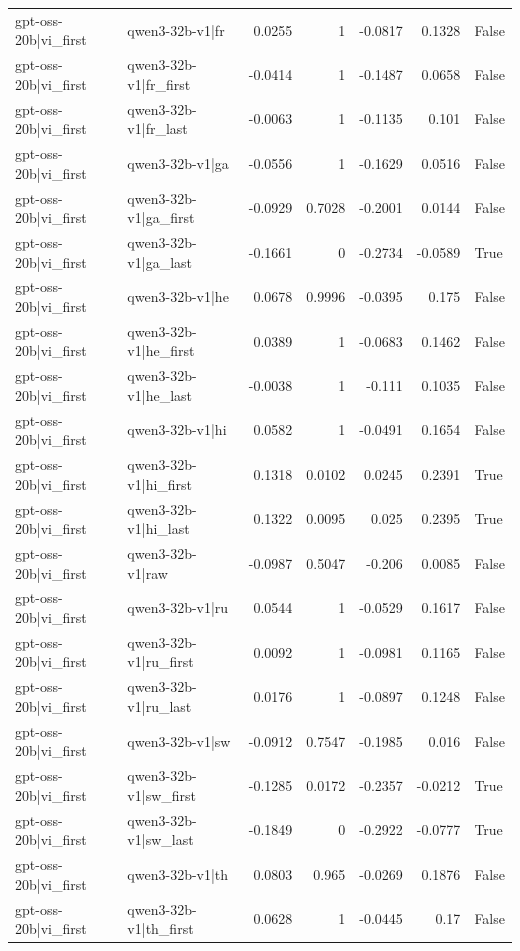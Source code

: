 \begin{table}
\begin{tabular}{l l r r r r l}
gpt-oss-20b|vi_first & qwen3-32b-v1|fr & 0.0255 & 1 & -0.0817 & 0.1328 & False \\
gpt-oss-20b|vi_first & qwen3-32b-v1|fr_first & -0.0414 & 1 & -0.1487 & 0.0658 & False \\
gpt-oss-20b|vi_first & qwen3-32b-v1|fr_last & -0.0063 & 1 & -0.1135 & 0.101 & False \\
gpt-oss-20b|vi_first & qwen3-32b-v1|ga & -0.0556 & 1 & -0.1629 & 0.0516 & False \\
gpt-oss-20b|vi_first & qwen3-32b-v1|ga_first & -0.0929 & 0.7028 & -0.2001 & 0.0144 & False \\
gpt-oss-20b|vi_first & qwen3-32b-v1|ga_last & -0.1661 & 0 & -0.2734 & -0.0589 & True \\
gpt-oss-20b|vi_first & qwen3-32b-v1|he & 0.0678 & 0.9996 & -0.0395 & 0.175 & False \\
gpt-oss-20b|vi_first & qwen3-32b-v1|he_first & 0.0389 & 1 & -0.0683 & 0.1462 & False \\
gpt-oss-20b|vi_first & qwen3-32b-v1|he_last & -0.0038 & 1 & -0.111 & 0.1035 & False \\
gpt-oss-20b|vi_first & qwen3-32b-v1|hi & 0.0582 & 1 & -0.0491 & 0.1654 & False \\
gpt-oss-20b|vi_first & qwen3-32b-v1|hi_first & 0.1318 & 0.0102 & 0.0245 & 0.2391 & True \\
gpt-oss-20b|vi_first & qwen3-32b-v1|hi_last & 0.1322 & 0.0095 & 0.025 & 0.2395 & True \\
gpt-oss-20b|vi_first & qwen3-32b-v1|raw & -0.0987 & 0.5047 & -0.206 & 0.0085 & False \\
gpt-oss-20b|vi_first & qwen3-32b-v1|ru & 0.0544 & 1 & -0.0529 & 0.1617 & False \\
gpt-oss-20b|vi_first & qwen3-32b-v1|ru_first & 0.0092 & 1 & -0.0981 & 0.1165 & False \\
gpt-oss-20b|vi_first & qwen3-32b-v1|ru_last & 0.0176 & 1 & -0.0897 & 0.1248 & False \\
gpt-oss-20b|vi_first & qwen3-32b-v1|sw & -0.0912 & 0.7547 & -0.1985 & 0.016 & False \\
gpt-oss-20b|vi_first & qwen3-32b-v1|sw_first & -0.1285 & 0.0172 & -0.2357 & -0.0212 & True \\
gpt-oss-20b|vi_first & qwen3-32b-v1|sw_last & -0.1849 & 0 & -0.2922 & -0.0777 & True \\
gpt-oss-20b|vi_first & qwen3-32b-v1|th & 0.0803 & 0.965 & -0.0269 & 0.1876 & False \\
gpt-oss-20b|vi_first & qwen3-32b-v1|th_first & 0.0628 & 1 & -0.0445 & 0.17 & False \\

\end{tabular}
\end{table}
